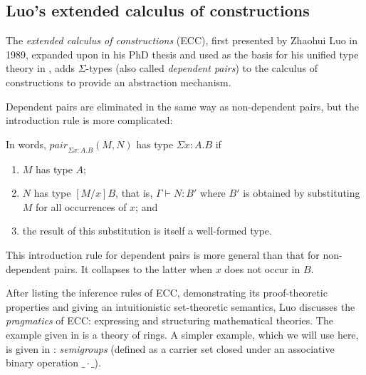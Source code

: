 \documentclass[12pt,toc=bibliography,numbers=noendperiod,
               footnotes=multiple,twoside]{scrartcl}
\begin{document}
\subsection{Luo's extended calculus of constructions}

The \emph{extended calculus of constructions} (ECC), first presented by Zhaohui Luo in 1989\autocite{luo_ecc_1989}, expanded upon in his PhD thesis\autocite{luo_extended_1990} and used as the basis for his unified type theory in \autocite{luo_computation_1994}, adds \(\Sigma\)-types (also called \emph{dependent pairs}) to the calculus of constructions to provide an abstraction mechanism.

Dependent pairs are eliminated in the same way as non-dependent pairs, but the introduction rule is more complicated:

\begin{prooftree}
\end{prooftree}

In words, \(\textit{pair}_{\Sigma x:A.B} (M,N)\) has type \(\Sigma x:A.B\) if

\begin{enumerate}
\item \(M\) has type \(A\);
\item \(N\) has type \([M/x] B\), that is, \(\Gamma \vdash N:B'\) where \(B'\) is obtained by substituting \(M\) for all occurrences of \(x\); and
\item the result of this substitution is itself a well-formed type.
\end{enumerate}

This introduction rule for dependent pairs is more general than that for non-dependent pairs. It collapses to the latter when \(x\) does not occur in \(B\).

After listing the inference rules of ECC, demonstrating its proof-theoretic properties and giving an intuitionistic set-theoretic semantics, Luo discusses the \textit{pragmatics} of ECC: expressing and structuring mathematical theories. The example given in \textcite{luo_ecc_1989} is a theory of rings. A simpler example, which we will use here, is given in \textcite{luo_extended_1990}: \emph{semigroups} (defined as a carrier set closed under an associative binary operation \(\_\cdot\_\)).
\end{document}
